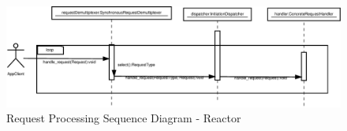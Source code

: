 
\begin{figure}[ht!]
	\centering
	\includegraphics[width=1\textwidth]{fig/image32.eps}
	\caption{Request Processing Sequence Diagram - Reactor}
	\label{fig:seq_diagram_r2}
\end{figure}




